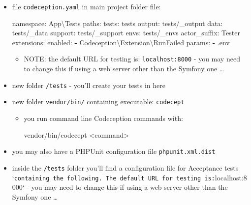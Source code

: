 \documentclass[a4paperpaper,openright]{book}
\newenvironment{Shaded}{}{}
\newcommand{\AttributeTok}[1]{\textcolor[rgb]{0.49,0.56,0.16}{#1}}
\newcommand{\ExtensionTok}[1]{#1}
\newcommand{\FunctionTok}[1]{\textcolor[rgb]{0.02,0.16,0.49}{#1}}
\newcommand{\KeywordTok}[1]{\textcolor[rgb]{0.00,0.44,0.13}{\textbf{#1}}}
\newcommand{\NormalTok}[1]{#1}
\newcommand{\OperatorTok}[1]{\textcolor[rgb]{0.40,0.40,0.40}{#1}}
\providecommand{\tightlist}{%
  \setlength{\itemsep}{0pt}\setlength{\parskip}{0pt}}
\begin{document}
\begin{itemize}
\item
  file \texttt{codeception.yaml} in main project folder file:

\begin{Shaded}
\begin{Highlighting}[]
    \FunctionTok{namespace:}\AttributeTok{ App\textbackslash{}Tests}
    \FunctionTok{paths:}
        \FunctionTok{tests:}\AttributeTok{ tests}
        \FunctionTok{output:}\AttributeTok{ tests/_output}
        \FunctionTok{data:}\AttributeTok{ tests/_data}
        \FunctionTok{support:}\AttributeTok{ tests/_support}
        \FunctionTok{envs:}\AttributeTok{ tests/_envs}
    \FunctionTok{actor_suffix:}\AttributeTok{ Tester}
    \FunctionTok{extensions:}
        \FunctionTok{enabled:}
            \KeywordTok{-}\NormalTok{ Codeception\textbackslash{}Extension\textbackslash{}RunFailed}
    \FunctionTok{params:}
        \KeywordTok{-}\NormalTok{ .env}
\end{Highlighting}
\end{Shaded}

  \begin{itemize}
  \tightlist
  \item
    NOTE: the default URL for testing is: \texttt{localhost:8000} - you
    may need to change this if using a web server other than the Symfony
    one \ldots{}
  \end{itemize}
\item
  new folder \texttt{/tests} - you'll create your tests in here
\item
  new folder \texttt{vendor/bin/} containing executable:
  \texttt{codecept}

  \begin{itemize}
  \item
    you run command line Codeception commands with:

\begin{Shaded}
\begin{Highlighting}[]
    \ExtensionTok{vendor/bin/codecept} \OperatorTok{<}\NormalTok{command}\OperatorTok{>}
\end{Highlighting}
\end{Shaded}
  \end{itemize}
\item
  you may also have a PHPUnit configuration file
  \texttt{phpunit.xml.dist}
\item
  inside the \texttt{/tests} folder you'll find a configuration file for
  Acceptance tests
  `\texttt{containing\ the\ following.\ The\ default\ URL\ for\ testing\ is:}localhost:8000`
  - you may need to change this if using a web server other than the
  Symfony one \ldots{}


\end{itemize}
\end{document}
